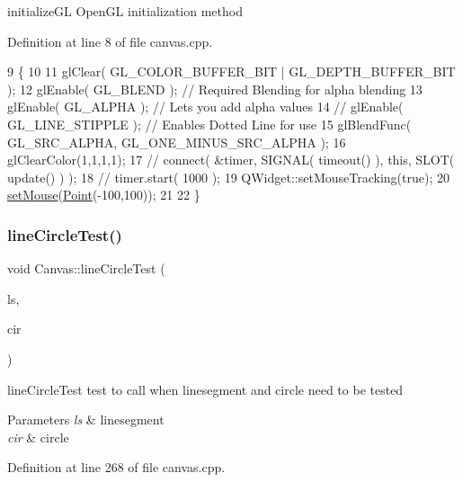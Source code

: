 initialize\+GL Open\+GL initialization method 



Definition at line 8 of file canvas.\+cpp.


\begin{DoxyCode}
9 \{
10 
11     glClear( GL\_COLOR\_BUFFER\_BIT | GL\_DEPTH\_BUFFER\_BIT );
12     glEnable( GL\_BLEND ); \textcolor{comment}{// Required Blending for alpha blending}
13     glEnable( GL\_ALPHA ); \textcolor{comment}{// Lets you add alpha values}
14     \textcolor{comment}{//    glEnable( GL\_LINE\_STIPPLE ); // Enables Dotted Line for use}
15     glBlendFunc( GL\_SRC\_ALPHA, GL\_ONE\_MINUS\_SRC\_ALPHA );
16     glClearColor(1,1,1,1);
17     \textcolor{comment}{//    connect( &timer, SIGNAL( timeout() ), this, SLOT( update() ) );}
18     \textcolor{comment}{//    timer.start( 1000 );}
19     QWidget::setMouseTracking(\textcolor{keyword}{true});
20     \hyperlink{class_canvas_a104679999425d8ffdc27454b71e5e1e3}{setMouse}(\hyperlink{class_point}{Point}(-100,100));
21 
22 \}
\end{DoxyCode}
\mbox{\label{class_canvas_a1c17d6af0a8770dc2022986cd27e4de4}} 
\subsubsection{\texorpdfstring{line\+Circle\+Test()}{lineCircleTest()}}
{\footnotesize\ttfamily void Canvas\+::line\+Circle\+Test (\begin{DoxyParamCaption}\item[{\hyperlink{class_line_segment}{Line\+Segment}}]{ls,  }\item[{\hyperlink{class_circle}{Circle}}]{cir }\end{DoxyParamCaption})\hspace{0.3cm}{\ttfamily [private]}}



line\+Circle\+Test test to call when linesegment and circle need to be tested 


\begin{DoxyParams}{Parameters}
{\em ls} & linesegment \\
\hline
{\em cir} & circle \\
\hline
\end{DoxyParams}


Definition at line 268 of file canvas.\+cpp.



